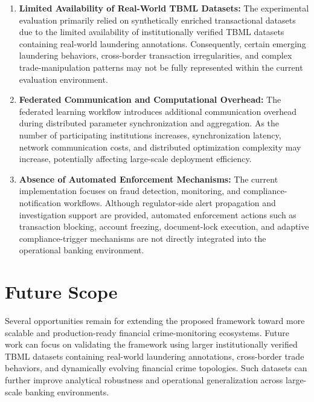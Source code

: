 \begin{enumerate}
\item \textbf{Limited Availability of Real-World TBML Datasets:} The experimental evaluation primarily relied on synthetically enriched transactional datasets due to the limited availability of institutionally verified TBML datasets containing real-world laundering annotations. Consequently, certain emerging laundering behaviors, cross-border transaction irregularities, and complex trade-manipulation patterns may not be fully represented within the current evaluation environment.

\item \textbf{Federated Communication and Computational Overhead:} The federated learning workflow introduces additional communication overhead during distributed parameter synchronization and aggregation. As the number of participating institutions increases, synchronization latency, network communication costs, and distributed optimization complexity may increase, potentially affecting large-scale deployment efficiency.

\item \textbf{Absence of Automated Enforcement Mechanisms:} The current implementation focuses on fraud detection, monitoring, and compliance-notification workflows. Although regulator-side alert propagation and investigation support are provided, automated enforcement actions such as transaction blocking, account freezing, document-lock execution, and adaptive compliance-trigger mechanisms are not directly integrated into the operational banking environment.

\end{enumerate}

\section{Future Scope}

Several opportunities remain for extending the proposed framework toward more scalable and production-ready financial crime-monitoring ecosystems. Future work can focus on validating the framework using larger institutionally verified TBML datasets containing real-world laundering annotations, cross-border trade behaviors, and dynamically evolving financial crime topologies. Such datasets can further improve analytical robustness and operational generalization across large-scale banking environments.

